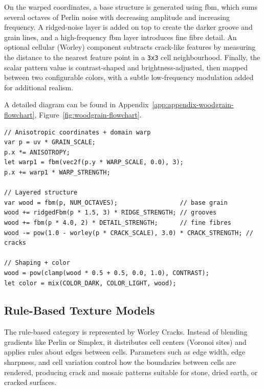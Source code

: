 On the warped coordinates, a base structure is generated using \gls{fbm}, which sums several octaves of Perlin noise with decreasing amplitude and increasing frequency. A ridged-noise layer is added on top to create the darker groove and grain lines, and a high-frequency \gls{fbm} layer introduces fine fibre detail. An optional cellular (Worley) component subtracts crack-like features by measuring the distance to the nearest feature point in a \texttt{3x3} cell neighbourhood. Finally, the scalar pattern value is contrast-shaped and brightness-adjusted, then mapped between two configurable colors, with a subtle low-frequency modulation added for additional realism.

A detailed diagram can be found in Appendix~\ref{app:appendix-woodgrain-flowchart}, Figure~\ref{fig:woodgrain-flowchart}.

\begin{lstlisting}[style=defaultcode, caption={Core of the Wood fragment shader (WGSL, abbreviated). Domain-warped fBm is combined with ridged noise, fine detail, and Worley-based cracks before contrast shaping and two-color mapping.}, label={lst:core-wood-fragment-shader}]
// Anisotropic coordinates + domain warp
var p = uv * GRAIN_SCALE;
p.x *= ANISOTROPY;
let warp1 = fbm(vec2f(p.y * WARP_SCALE, 0.0), 3);
p.x += warp1 * WARP_STRENGTH;

// Layered structure
var wood = fbm(p, NUM_OCTAVES);                 // base grain
wood += ridgedFbm(p * 1.5, 3) * RIDGE_STRENGTH; // grooves
wood += fbm(p * 4.0, 2) * DETAIL_STRENGTH;      // fine fibres
wood -= pow(1.0 - worley(p * CRACK_SCALE), 3.0) * CRACK_STRENGTH; // cracks

// Shaping + color
wood = pow(clamp(wood * 0.5 + 0.5, 0.0, 1.0), CONTRAST);
let color = mix(COLOR_DARK, COLOR_LIGHT, wood);
\end{lstlisting}

\subsection{Rule-Based Texture Models}

The rule-based category is represented by Worley Cracks. Instead of blending gradients like Perlin or Simplex, it distributes cell centers (Voronoi sites) and applies rules about edges between cells. Parameters such as edge width, edge sharpness, and cell variation control how the boundaries between cells are rendered, producing crack and mosaic patterns suitable for stone, dried earth, or cracked surfaces.

